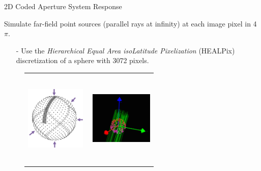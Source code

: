\documentclass[xcolor=x11names,compress]{beamer}
\renewcommand{\(}{\begin{columns}}
\renewcommand{\)}{\end{columns}}
\newcommand{\<}[1]{\begin{column}{#1}}
\renewcommand{\>}{\end{column}}
\begin{document}
\begin{frame}{2D Coded Aperture System Response}

Simulate far-field point sources (parallel rays at infinity) at each image pixel in 4$\pi$.
\begin{itemize}
\small
\item[-] Use the \emph{Hierarchical Equal Area isoLatitude Pixelization} (HEALPix) \cite{Gorski} discretization of a sphere with 3072 pixels.
\end{itemize}

\begin{figure}
\centering
\begin{tabular}{m{0.3\linewidth} m{0.3\linewidth}}
\includegraphics[height=1.2in]{Figures/Healpix.png} &
\includegraphics[height=1.8in]{Figures/FarFieldVis2.png}
\end{tabular}
\end{figure}

\end{frame}
\end{document}
